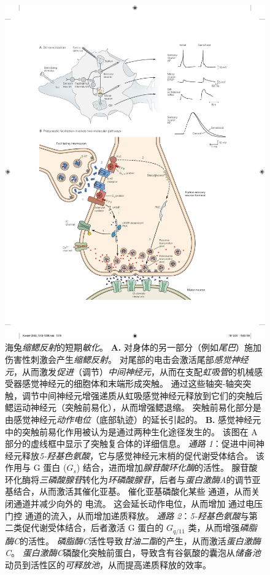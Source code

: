 \begin{figure}[htbp]
	\centering
	\includegraphics[width=0.9\linewidth]{chap53/fig_53_4}
	\caption{海兔\textit{缩鳃反射}的短期\textit{敏化}。
		\textbf{A.} 对身体的另一部分（例如\textit{尾巴}）施加伤害性刺激会产生\textit{缩鳃反射}。
		对尾部的电击会激活尾部\textit{感觉神经元}，从而激发\textit{促进}（调节）\textit{中间神经元}，从而在支配\textit{虹吸管}的机械感受器感觉神经元的细胞体和末端形成突触。
		通过这些轴突-轴突突触，调节中间神经元增强递质从虹吸感觉神经元释放到它们的突触后鳃运动神经元（突触前易化），从而增强鳃退缩。
		突触前易化部分是由感觉神经元\textit{动作电位}（底部轨迹）的延长引起的\cite{pinsker1970habituation,klein1980mechanism}。
		\textbf{B.} 感觉神经元中的突触前易化作用被认为是通过两种生化途径发生的。
		该图在 A 部分的虚线框中显示了突触复合体的详细信息。
		\textit{通路 1}：促进中间神经元释放\textit{5-羟基色氨酸}，它与感觉神经元末梢的促代谢受体结合。
		该作用与 G 蛋白 ($ G_s $) 结合，进而增加\textit{腺苷酸环化酶}的活性。
		腺苷酸环化酶将\textit{三磷酸腺苷}转化为\textit{环磷酸腺苷}，后者与\textit{蛋白激酶A}的调节亚基结合，从而激活其催化亚基。
		催化亚基磷酸化某些  通道，从而关闭通道并减少向外的  电流。
		这会延长动作电位，从而增加  通过电压门控  通道的流入，从而增加递质释放。
		\textit{通路 2}：\textit{5-羟基色氨酸}与第二类促代谢受体结合，后者激活 G 蛋白的 $ G_{q/11} $ 类，从而增强\textit{磷脂酶C}的活性。
		\textit{磷脂酶C}活性导致\textit{甘油二酯}的产生，从而激活\textit{蛋白激酶C}。
		\textit{蛋白激酶C}磷酸化突触前蛋白，导致含有谷氨酸的囊泡从\textit{储备池}动员到活性区的\textit{可释放池}，从而提高递质释放的效率。}
	\label{fig:53_4}
\end{figure}


